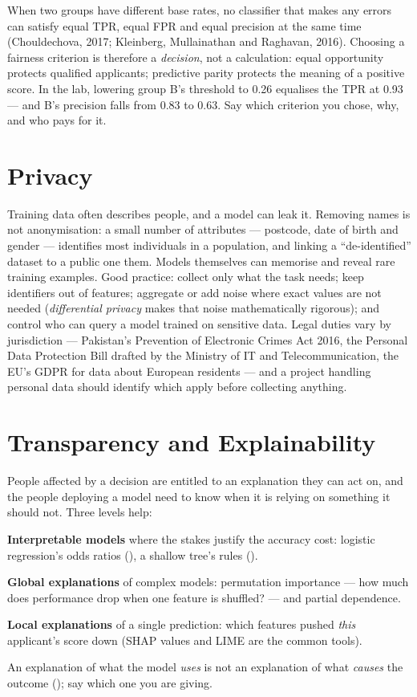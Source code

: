 \begin{alertbox}
When two groups have different base rates, no classifier that makes any errors can
satisfy equal TPR, equal FPR and equal precision at the same time (Chouldechova, 2017;
Kleinberg, Mullainathan and Raghavan, 2016). Choosing a fairness criterion is
therefore a \emph{decision}, not a calculation: equal opportunity protects qualified
applicants; predictive parity protects the meaning of a positive score. In the lab,
lowering group B's threshold to 0.26 equalises the TPR at 0.93 --- and B's precision
falls from 0.83 to 0.63. Say which criterion you chose, why, and who pays for it.
\end{alertbox}

\section{Privacy}

Training data often describes people, and a model can leak it. Removing names is not
anonymisation: a small number of attributes --- postcode, date of birth and gender ---
identifies most individuals in a population, and linking a ``de-identified'' dataset to a
public one  them. Models themselves can memorise and reveal rare
training examples. Good practice: collect only what the task needs; keep identifiers
out of features; aggregate or add noise where exact values are not needed
(\emph{differential privacy} makes that noise mathematically rigorous); and control
who can query a model trained on sensitive data. Legal duties vary by jurisdiction ---
Pakistan's Prevention of Electronic Crimes Act 2016, the Personal Data Protection Bill
drafted by the Ministry of IT and Telecommunication, the EU's GDPR for data about
European residents --- and a project handling personal data should identify which apply
before collecting anything.

\section{Transparency and Explainability}

People affected by a decision are entitled to an explanation they can act on, and the
people deploying a model need to know when it is relying on something it should not.
Three levels help:
\begin{tight}
  \item \textbf{Interpretable models} where the stakes justify the accuracy cost:
        logistic regression's odds ratios (), a shallow tree's rules
        ().
  \item \textbf{Global explanations} of complex models: permutation importance ---
        how much does performance drop when one feature is shuffled? --- and partial
        dependence.
  \item \textbf{Local explanations} of a single prediction: which features pushed
        \emph{this} applicant's score down (SHAP values and LIME are the common tools).
\end{tight}
An explanation of what the model \emph{uses} is not an explanation of what
\emph{causes} the outcome (); say which one you are giving.

